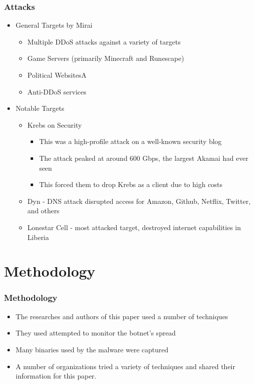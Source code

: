 \documentclass{beamer}
\begin{document}
\begin{frame}
    \frametitle{Attacks}
	\begin{itemize}
		\item General Targets by Mirai
			\begin{itemize}
				\item Multiple DDoS attacks against a variety of targets
				\item Game Servers (primarily Minecraft and Runescape)
				\item Political WebsitesA
				\item Anti-DDoS services
			\end{itemize}
		\item Notable Targets
			\begin{itemize}
				\item Krebs on Security
				\begin{itemize}
					\item This was a high-profile attack on a well-known security blog
					\item The attack peaked at around 600 Gbps, the largest Akamai had ever seen 						\item This forced them to drop Krebs as a client due to high costs
				\end{itemize}
				\item Dyn - DNS attack disrupted access for Amazon, Github, Netflix, Twitter, and others
				\item Lonestar Cell - most attacked target, destroyed internet capabilities in Liberia
			\end{itemize}
	\end{itemize}
\end{frame}

\section{Methodology}

\begin{frame}
	\frametitle{Methodology}
	\begin{itemize}
		\item The researches and authors of this paper used a number of techniques
		\item They used attempted to monitor the botnet's spread
		\item Many binaries used by the malware were captured
		\item A number of organizations tried a variety of techniques and shared their information for this paper.
	\end{itemize}
\end{frame}
\end{document}
